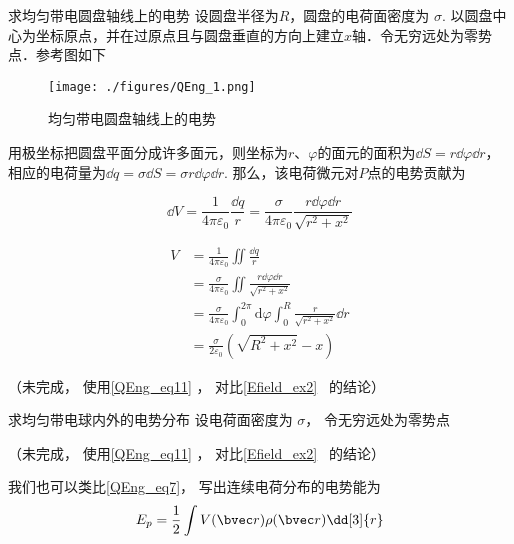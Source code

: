 \begin{example}{求均匀带电圆盘轴线上的电势}
设圆盘半径为$R$，圆盘的电荷面密度为 $\sigma$. 以圆盘中心为坐标原点，并在过原点且与圆盘垂直的方向上建立$x$轴．令无穷远处为零势点．参考图如下
\begin{figure}[ht]
\centering
\texttt{[image: ./figures/QEng\_1.png]}
\caption{均匀带电圆盘轴线上的电势} \label{QEng_fig1}
\end{figure}

用极坐标把圆盘平面分成许多面元，则坐标为$r$、$\varphi$的面元的面积为$\dd S=r\dd \varphi \dd r$，相应的电荷量为$\dd q=\sigma\dd S=\sigma r\dd \varphi \dd r$. 那么，该电荷微元对$P$点的电势贡献为

\begin{equation}
\dd V =\frac{1}{4 \pi \varepsilon_{0}}\frac{\dd q }{r}=\frac{\sigma}{4 \pi\varepsilon_{0} }\frac{r \dd \varphi \dd r}{ \sqrt{r^{2}+x^{2}}}
\end{equation}

\begin{equation}
\begin{aligned}
V & =\frac{1}{4 \pi \varepsilon_{0}}\iint \frac{\dd q }{r}\\
& =\frac{\sigma }{4 \pi \varepsilon_{0}}\iint \frac{r \dd \varphi \dd r}{ \sqrt{r^{2}+x^{2}}}\\
& = \frac{\sigma}{4 \pi \varepsilon_{0}} \int_{0}^{2 \pi} \mathrm{d} \varphi \int_{0}^{R} \frac{r}{\sqrt{r^{2}+x^{2}}}\dd r\\ 
& = \frac{\sigma}{2 \varepsilon_{0}}\left(\sqrt{R^{2}+x^{2}}-x\right)
\end{aligned}
\end{equation}


（未完成， 使用\autoref{QEng_eq11} ， 对比\autoref{Efield_ex2}~ 的结论）
\end{example}

\begin{example}{求均匀带电球内外的电势分布}
设电荷面密度为 $\sigma$， 令无穷远处为零势点

（未完成， 使用\autoref{QEng_eq11} ， 对比\autoref{Efield_ex2}~ 的结论）
\end{example}

我们也可以类比\autoref{QEng_eq7}， 写出连续电荷分布的电势能为
\begin{equation}\label{QEng_eq8}
E_p = \frac 12 \int V(\bvec r) \rho(\bvec r) \dd[3]{r}
\end{equation}

